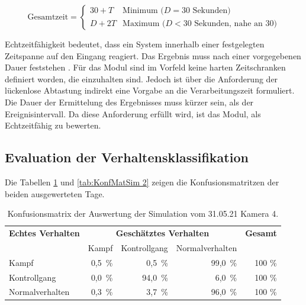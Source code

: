 \begin{equation}
    \label{eq:deltTErkenn}
    \text{Gesamtzeit} = 
    \begin{cases} 
    30 + T & \text{Minimum (} D = 30 \text{ Sekunden)} \\
    D + 2T & \text{Maximum (} D < 30 \text{ Sekunden, nahe an 30)}
    \end{cases}
\end{equation}

 Echtzeitfähigkeit bedeutet, dass ein System innerhalb einer festgelegten Zeitspanne auf den Eingang reagiert. Das Ergebnis muss nach einer vorgegebenen Dauer feststehen \cite{Scholz.2005}. Für das Modul sind im Vorfeld keine harten Zeitschranken definiert worden, die einzuhalten sind. Jedoch ist über die Anforderung der lückenlose Abtastung indirekt eine Vorgabe an die Verarbeitungszeit formuliert. Die Dauer der Ermittelung des Ergebnisses muss kürzer sein, als der Ereignisintervall. Da diese Anforderung erfüllt wird, ist das Modul, als Echtzeitfähig zu bewerten. 


\subsection{Evaluation der Verhaltensklassifikation}
Die Tabellen \ref{tab:KonfMatSim 1} und \ref{tab:KonfMatSim 2} zeigen die Konfusionsmatritzen der beiden ausgewerteten Tage. 

\begin{table}[htbp]
    \centering
    \caption{Konfusionsmatrix der Auswertung der Simulation vom 31.05.21 Kamera 4.}
    \label{tab:KonfMatSim 1}
    \begin{tabular}{l|rrr|r}
        \toprule
        \multirow{1}{*}{\textbf{Echtes Verhalten}} & \multicolumn{3}{c|}{\textbf{Geschätztes Verhalten}} & {\textbf{Gesamt}}\\
         & Kampf & Kontrollgang & Normalverhalten & \\
        \midrule
        Kampf                & 0,5\, \% &  0,5\, \% & 99,0\, \% & 100 \%\\
        Kontrollgang         & 0,0\, \% & 94,0\, \% &  6,0\, \% & 100 \%\\
        Normalverhalten      & 0,3\, \% &  3,7\, \% & 96,0\, \% & 100 \%\\
        \bottomrule
    \end{tabular}
\end{table}


